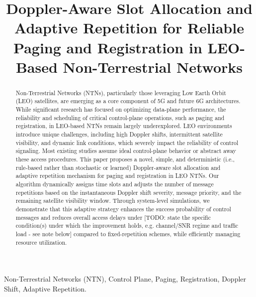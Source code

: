 \documentclass[conference]{IEEEtran}
\begin{document}
\title{Doppler-Aware Slot Allocation and Adaptive Repetition for Reliable Paging and Registration in LEO-Based Non-Terrestrial Networks}
\author{
}

\maketitle

\begin{abstract}
Non-Terrestrial Networks (NTNs), particularly those leveraging Low Earth Orbit (LEO) satellites, are emerging as a core component of 5G and future 6G architectures. While significant research has focused on optimizing data-plane performance, the reliability and scheduling of critical control-plane operations, such as paging and registration, in LEO-based NTNs remain largely underexplored. LEO environments introduce unique challenges, including high Doppler shifts, intermittent satellite visibility, and dynamic link conditions, which severely impact the reliability of control signaling. Most existing studies assume ideal control-plane behavior or abstract away these access procedures. This paper proposes a novel, simple, and deterministic (i.e., rule-based rather than stochastic or learned) Doppler-aware slot allocation and adaptive repetition mechanism for paging and registration in LEO NTNs. Our algorithm       dynamically assigns time slots and adjusts the number of message repetitions based on the instantaneous Doppler shift severity, message priority, and the remaining satellite visibility window. Through system-level simulations, we demonstrate that this adaptive strategy enhances the success probability of control messages and reduces overall access delays under [TODO: state the specific condition(s) under which the improvement holds, e.g. channel/SNR regime and traffic load - see note below] compared to fixed-repetition schemes, while efficiently managing resource utilization. %
\end{abstract}

\begin{IEEEkeywords}
Non-Terrestrial Networks (NTN), Control Plane, Paging, Registration, Doppler Shift, Adaptive Repetition.
\end{IEEEkeywords}
\end{document}
